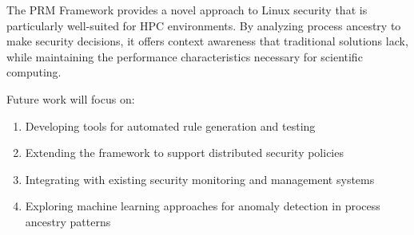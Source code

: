 \documentclass[conference]{IEEEtran}
\begin{document}
The PRM Framework provides a novel approach to Linux security that is particularly well-suited for HPC environments. By analyzing process ancestry to make security decisions, it offers context awareness that traditional solutions lack, while maintaining the performance characteristics necessary for scientific computing.

Future work will focus on:

\begin{enumerate}
\item Developing tools for automated rule generation and testing
\item Extending the framework to support distributed security policies
\item Integrating with existing security monitoring and management systems
\item Exploring machine learning approaches for anomaly detection in process ancestry patterns
\end{enumerate}
\end{document}
